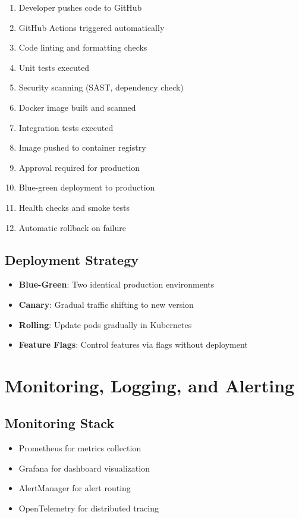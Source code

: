 \documentclass[12pt,a4paper]{report}
\begin{document}
\begin{enumerate}
    \item Developer pushes code to GitHub
    \item GitHub Actions triggered automatically
    \item Code linting and formatting checks
    \item Unit tests executed
    \item Security scanning (SAST, dependency check)
    \item Docker image built and scanned
    \item Integration tests executed
    \item Image pushed to container registry
    \item Approval required for production
    \item Blue-green deployment to production
    \item Health checks and smoke tests
    \item Automatic rollback on failure
\end{enumerate}

\subsection{Deployment Strategy}

\begin{itemize}[label=\textbullet]
    \item \textbf{Blue-Green}: Two identical production environments
    \item \textbf{Canary}: Gradual traffic shifting to new version
    \item \textbf{Rolling}: Update pods gradually in Kubernetes
    \item \textbf{Feature Flags}: Control features via flags without deployment
\end{itemize}

\section{Monitoring, Logging, and Alerting}

\subsection{Monitoring Stack}

\begin{itemize}[label=\textbullet]
    \item Prometheus for metrics collection
    \item Grafana for dashboard visualization
    \item AlertManager for alert routing
    \item OpenTelemetry for distributed tracing
\end{itemize}
\end{document}

